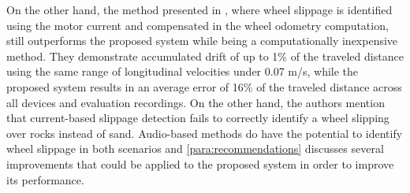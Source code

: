 On the other hand, the method presented in \cite{Ojeda2006}, where wheel
slippage is identified using the motor current and compensated in the wheel
odometry computation, still outperforms the proposed system while being a
computationally inexpensive method. They demonstrate accumulated drift of up to
1\% of the traveled distance using the same range of longitudinal velocities
under 0.07 m/s, while the proposed system results in an average error of
16\% of the traveled distance across all devices and evaluation recordings.
On the other hand, the authors mention that current-based slippage detection
fails to correctly identify a wheel slipping over rocks instead of sand.
Audio-based methods do have the potential to identify wheel slippage in both
scenarios and \cref{para:recommendations} discusses several improvements that
could be applied to the proposed system in order to improve its performance.